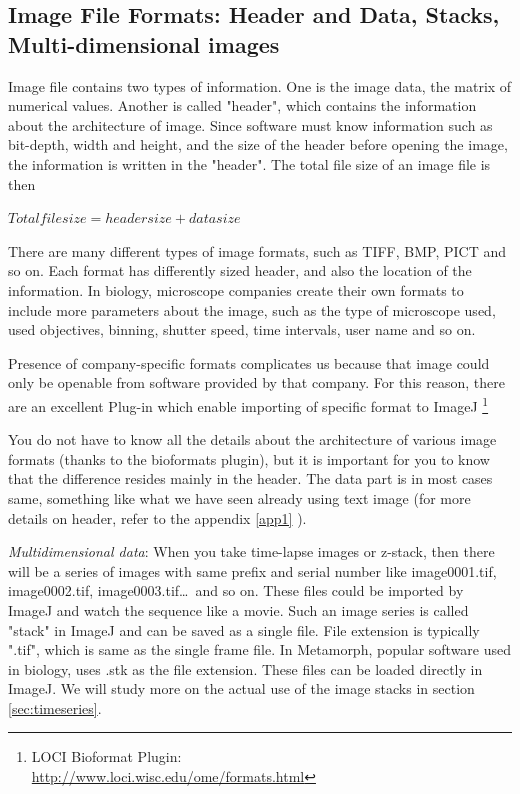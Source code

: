 \subsection{Image File Formats: Header and Data, Stacks, Multi-dimensional images}

Image file contains two types of information. 
One is the image data, the matrix of numerical values. 
Another is called "header", which contains the information about the architecture of image. 
Since software must know information such as bit-depth, width and height, and the size of 
the header before opening the image, the information is written in the "header". 
The total file size of an image file is then 

$Total file size = header size + data size$

There are many different types of image formats, such as TIFF, BMP, PICT and so
on. Each format has differently sized header, and also the location of the
information. In biology, microscope companies create their own formats to
include more parameters about the image, such as the type of microscope used,
used objectives, binning, shutter speed, time intervals, user name and so on.

Presence of company-specific formats complicates us because that image could
only be openable from software provided by that company. For this reason, there
are an excellent Plug-in which enable importing of specific format to ImageJ
\footnote{\tab LOCI Bioformat Plugin:\\
\url{http://www.loci.wisc.edu/ome/formats.html}}

You do not have to know all the details about the architecture of various image
formats (thanks to the bioformats plugin), but it is important for you to know
that the difference resides mainly in the header. The data part is in most cases
same, something like what we have seen already using text image (for more
details on header, refer to the appendix \ref{app1} ).

\textit{Multidimensional data}: When you take time-lapse images or z-stack, then
there will be a series of images with same prefix and serial number like
image0001.tif, image0002.tif, image0003.tif\dots\ and so on. These files could
be imported by ImageJ and watch the sequence like a movie. Such an image series
is called "stack" in ImageJ and can be saved as a single file. File extension is
typically ".tif", which is same as the single frame file. In Metamorph, popular
software used in biology, uses .stk as the file extension. These files can be
loaded directly in ImageJ. We will study more on the actual use of the image
stacks in section \ref{sec:timeseries}.

